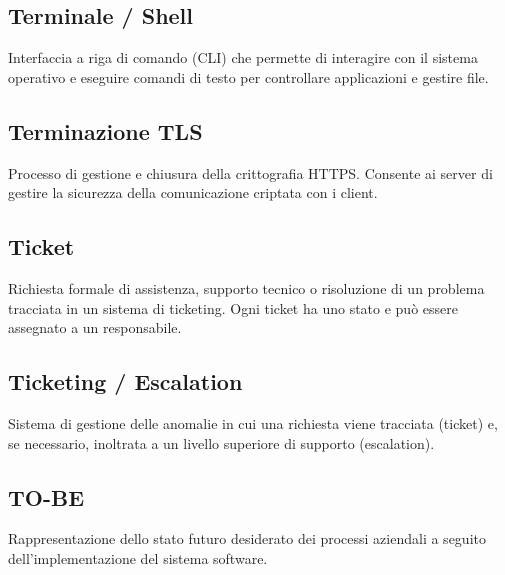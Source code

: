 \documentclass[a4paper, 11pt, oneside]{scrartcl} %
\begin{document}
\subsection*{Terminale / Shell}


Interfaccia a riga di comando (CLI) che permette di interagire con il sistema operativo e eseguire comandi di testo per controllare applicazioni e gestire file.

\vspace{0.5cm}

\subsection*{Terminazione TLS}


Processo di gestione e chiusura della crittografia HTTPS. Consente ai server di gestire la sicurezza della comunicazione criptata con i client.

\vspace{0.5cm}

\subsection*{Ticket}


Richiesta formale di assistenza, supporto tecnico o risoluzione di un problema tracciata in un sistema di ticketing. Ogni ticket ha uno stato e può essere assegnato a un responsabile.

\vspace{0.5cm}

\subsection*{Ticketing / Escalation}
Sistema di gestione delle anomalie in cui una richiesta viene tracciata (ticket) e, se necessario, inoltrata a un livello superiore di supporto (escalation).
\vspace{0.5cm}

\subsection*{TO-BE}
Rappresentazione dello stato futuro desiderato dei processi aziendali a seguito dell'implementazione del sistema software.
\vspace{0.5cm}
\end{document}
